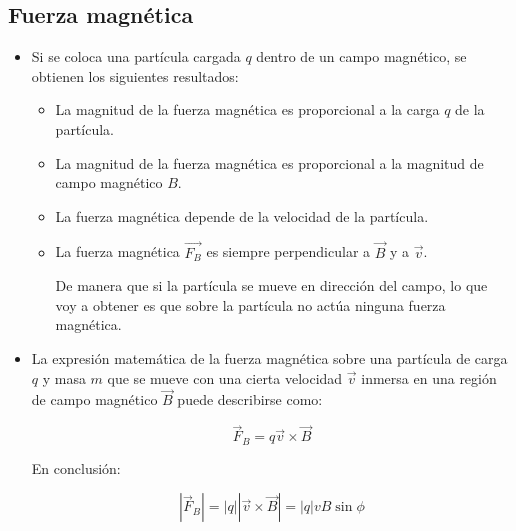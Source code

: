 \documentclass[a4paper,10pt]{article}
\begin{document}

\subsection{Fuerza magnética}

\begin{itemize}
    
\item Si se coloca una partícula cargada $q$ dentro de un campo magnético,
se obtienen los siguientes resultados:

    \begin{itemize}
        
    \item La magnitud de la fuerza magnética es proporcional a la carga
    $q$ de la partícula.

    \item La magnitud de la fuerza magnética es proporcional a la magnitud de
    campo magnético $B$.

    \item La fuerza magnética depende de la velocidad de la partícula.
    
    \item La fuerza magnética $\vec{F_B}$ es siempre perpendicular a $\vec{B}$
    y a $\vec{v}$.

    De manera que si la partícula se mueve en dirección del campo, lo que
    voy a obtener es que sobre la partícula no actúa ninguna fuerza magnética.

    \end{itemize}

\item \label{F_B} La expresión matemática de la fuerza magnética sobre una partícula
de carga $q$ y masa $m$ que se mueve con una cierta velocidad $\vec{v}$
inmersa en una región de campo magnético $\vec{B}$ puede describirse como:

\begin{equation*}
    \boxed{
    \vec{F}_{B}=q\vec{v}\times\vec{B}
    }
\end{equation*}

En conclusión:

\begin{equation*}
    \boxed{
    \left\lvert\vec{F}_{B}\right\rvert
    =\left\lvert q\right\lvert \left\lvert\vec{v}\times\vec{B}\right\lvert
    =\left\lvert q\right\lvert vB\sin\phi
    }
\end{equation*}


\end{itemize}
\end{document}
